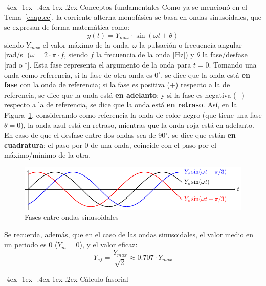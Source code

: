 \documentclass[11pt]{book} %
\makeatletter
\numberwithin{dummy}{section}
\theoremstyle{ocrenumbox}
\theoremstyle{blacknumex}
\theoremstyle{blacknumbox}
\theoremstyle{ocrenum}
\renewcommand{\section}{\@startsection{section}{1}{\z@}
{-4ex \@plus -1ex \@minus -.4ex}
{1ex \@plus.2ex }
{\normalfont\large\sffamily\bfseries}}
\newlength\esp
\makeatother
\begin{document}
	\section{Conceptos fundamentales}
	Como ya se mencionó en el Tema~\ref{chap.cc}, la corriente alterna monofásica se basa en ondas sinusoidales, que se expresan de forma matemática como:
	\begin{equation}\label{eq.y_senoidal}
		\boxed{y(t)=Y_{max}\cdot\sin(\omega t+\theta)} 
	\end{equation}
	siendo $Y_{max}$ el valor máximo de la onda, $\omega$ la pulsación o frecuencia angular [rad/s] ($\omega=2\cdot\pi\cdot f$, siendo $f$ la frecuencia de la onda [Hz]) y $\theta$ la fase/desfase [rad o $^\circ$]. Esta fase representa el argumento de la onda para $t=0$. Tomando una onda como referencia, si la fase de otra onda es $0^\circ$, se dice que la onda está \textbf{en fase} con la onda de referencia; si la fase es positiva ($+$) respecto a la de referencia, se dice que la onda está \textbf{en adelanto}; y si la fase es negativa ($-$) respecto a la de referencia, se dice que la onda está \textbf{en retraso}. Así, en la Figura~\ref{fig.desfase}, considerando como referencia la onda de color negro (que tiene una fase $\theta=0$), la {\color{blue} onda azul} está en retraso, mientras que la {\color{red} onda roja} está en adelanto. En caso de que el desfase entre dos ondas sea de 90$^\circ$, se dice que están \textbf{en cuadratura}: el paso por 0 de una onda, coincide con el paso por el máximo/mínimo de la otra.
	\begin{figure}[htbp]
		\centering
		\includegraphics[width=.9\linewidth]{../figs/desfase.pdf}
		\caption{Fases entre ondas sinusoidales}
		\label{fig.desfase}
	\end{figure}
	
	Se recuerda, además, que en el caso de las ondas sinusoidales, el valor medio en un periodo es 0 ($Y_m=0$), y el valor eficaz: 
	\begin{equation}
		\boxed{Y_{ef}=\dfrac{Y_{max}}{\sqrt{2}}\approx0.707\cdot Y_{max}}
	\end{equation}
	
	\section{Cálculo fasorial}
	
\end{document}
